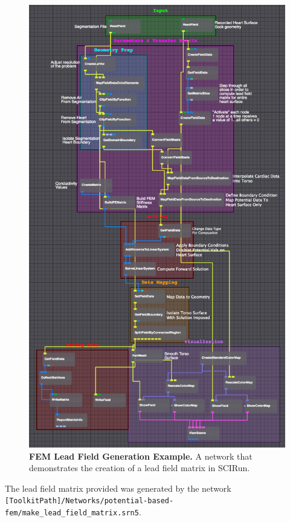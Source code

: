 \begin{figure}[H]
\vspace{-.25in}
\begin{center}
\includegraphics[width=.75\textwidth]{ECGToolkitGuide_figures/FEMLead.png}
\caption{{\bf FEM Lead Field Generation Example.} A network that demonstrates the creation of a lead field matrix in SCIRun.}
\label{fig:FEMLead}
\end{center}
\vspace{-.25in}
\end{figure}
\noindent 
The lead field matrix provided was generated by the network \newline
{\tt [ToolkitPath]/Networks/potential-based-fem/make\_lead\_field\_matrix.srn5}.

